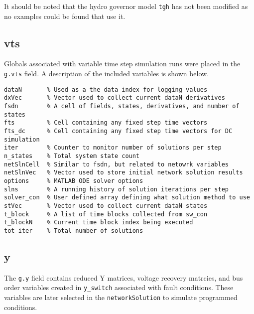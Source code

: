 It should be noted that the hydro governor model \verb|tgh| has not been modified as no examples could be found that use it.

\subsection{vts}  
Globals associated with variable time step simulation runs were placed in the \verb|g.vts| field.
A description of the included variables is shown below.

\begin{verbatim}
dataN       % Used as a the data index for logging values
dxVec       % Vector used to collect current dataN derivatives
fsdn        % A cell of fields, states, derivatives, and number of states
fts         % Cell containing any fixed step time vectors
fts_dc      % Cell containing any fixed step time vectors for DC simulation
iter        % Counter to monitor number of solutions per step
n_states    % Total system state count
netSlnCell  % Similar to fsdn, but related to netowrk variables
netSlnVec   % Vector used to store initial network solution results
options     % MATLAB ODE solver options
slns        % A running history of solution iterations per step
solver_con  % User defined array defining what solution method to use
stVec       % Vector used to collect current dataN states
t_block     % A list of time blocks collected from sw_con
t_blockN    % Current time block index being executed
tot_iter    % Total number of solutions
\end{verbatim}

\subsection{y}  
The \verb|g.y| field contains reduced Y matrices, voltage recovery matrcies, and bus order variables created in \verb|y_switch| associated with fault conditions.
These variables are later selected in the \verb|networkSolution| to simulate programmed conditions.

\begin{comment}

template for subparagraphs

\subsection{xxx} %
\begin{verbatim}

\end{verbatim}

\end{comment}